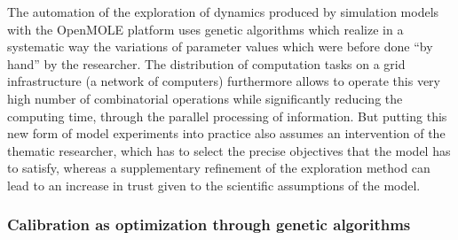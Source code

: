 \documentclass[10pt]{article}
\begin{document}
The automation of the exploration of dynamics produced by simulation models with the OpenMOLE platform uses genetic algorithms which realize in a systematic way the variations of parameter values which were before done ``by hand'' by the researcher. The distribution of computation tasks on a grid infrastructure (a network of computers) furthermore allows to operate this very high number of combinatorial operations while significantly reducing the computing time, through the parallel processing of information. But putting this new form of model experiments into practice also assumes an intervention of the thematic researcher, which has to select the precise objectives that the model has to satisfy, whereas a supplementary refinement of the exploration method can lead to an increase in trust given to the scientific assumptions of the model.


\subsubsection*{Calibration as optimization through genetic algorithms}
\end{document}
